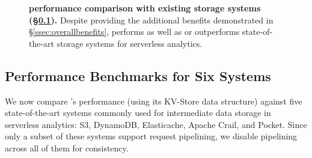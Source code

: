 \begin{figure}
  \centering
  \caption[\jiffy performance comparison with existing storage systems]{\small{\textbf{\jiffy performance comparison with existing storage systems (\S\ref{ssec:hrelated}).} Despite providing the additional benefits demonstrated in \S\ref{ssec:overallbenefits}, \jiffy performs as well as or outperforms state-of-the-art storage systems for serverless analytics.}}
  \label{fig:storage-perf}
\end{figure}

\subsection{Performance Benchmarks for Six Systems}
\label{ssec:hrelated}

We now compare \jiffy’s performance (using its KV-Store data structure) against five state-of-the-art systems commonly used for intermediate data storage in serverless analytics: S3, DynamoDB, Elasticache, Apache Crail, and Pocket. Since only a subset of these systems support request pipelining, we disable pipelining across all of them for consistency.


